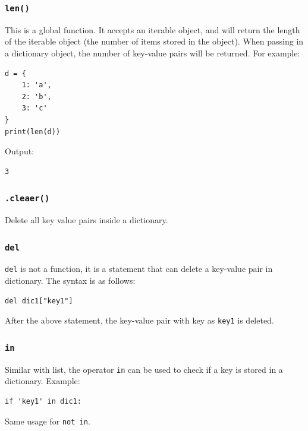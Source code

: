 \documentclass[12pt]{book}
\begin{document}
\subsubsection{\texttt{len()}}
\label{sec:orga3bb7a6}
This is a global function. It accepts an iterable object, and will return the length of the iterable object (the number of items stored in the object). When passing in a dictionary object, the number of key-value pairs will be returned. For example:
\begin{verbatim}
d = {
    1: 'a',
    2: 'b',
    3: 'c'
}
print(len(d))
\end{verbatim}
Output:
\begin{verbatim}
3
\end{verbatim}
\subsubsection{\texttt{.cleaer()}}
\label{sec:org36749c8}
Delete all key value pairs inside a dictionary.
\subsubsection{\texttt{del}}
\label{sec:org611b854}
\texttt{del} is not a function, it is a statement that can delete a key-value pair in dictionary. The syntax is as follows:
\begin{verbatim}
del dic1["key1"]
\end{verbatim}
After the above statement, the key-value pair with key as \texttt{key1} is deleted.
\subsubsection{\texttt{in}}
\label{sec:orgbcdaf72}
Similar with list, the operator \texttt{in} can be used to check if a key is stored in a dictionary. Example:
\begin{verbatim}
if 'key1' in dic1:
\end{verbatim}
Same usage for \texttt{not in}.
\end{document}
